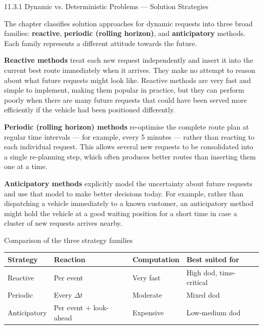 \documentclass[aspectratio=169,10pt]{beamer}
\begin{document}
\begin{frame}[allowframebreaks]{11.3.1 Dynamic vs. Deterministic Problems — Solution Strategies}

  The chapter classifies solution approaches for dynamic requests into three
  broad families: \textbf{reactive}, \textbf{periodic (rolling horizon)}, and
  \textbf{anticipatory} methods.  Each family represents a different attitude
  towards the future.

  \bigskip
  \textbf{Reactive methods} treat each new request independently and insert it
  into the current best route immediately when it arrives.  They make no
  attempt to reason about what future requests might look like.  Reactive
  methods are very fast and simple to implement, making them popular in
  practice, but they can perform poorly when there are many future requests
  that could have been served more efficiently if the vehicle had been
  positioned differently.

  \bigskip
  \textbf{Periodic (rolling horizon) methods} re-optimise the complete route
  plan at regular time intervals — for example, every 5 minutes — rather than
  reacting to each individual request.  This allows several new requests to
  be consolidated into a single re-planning step, which often produces better
  routes than inserting them one at a time.

  \bigskip
  \textbf{Anticipatory methods} explicitly model the uncertainty about future
  requests and use that model to make better decisions today.  For example,
  rather than dispatching a vehicle immediately to a known customer, an
  anticipatory method might hold the vehicle at a good waiting position for a
  short time in case a cluster of new requests arrives nearby.

  \framebreak

  \begin{block}{Comparison of the three strategy families}
    \begin{tabular}{lllp{4.5cm}}
      \toprule
      Strategy & Reaction & Computation & Best suited for\\
      \midrule
      Reactive & Per event & Very fast & High dod, time-critical\\
      Periodic  & Every $\Delta t$ & Moderate & Mixed dod\\
      Anticipatory & Per event + look-ahead & Expensive & Low-medium dod\\
      \bottomrule
    \end{tabular}
  \end{block}


\end{frame}
\end{document}
